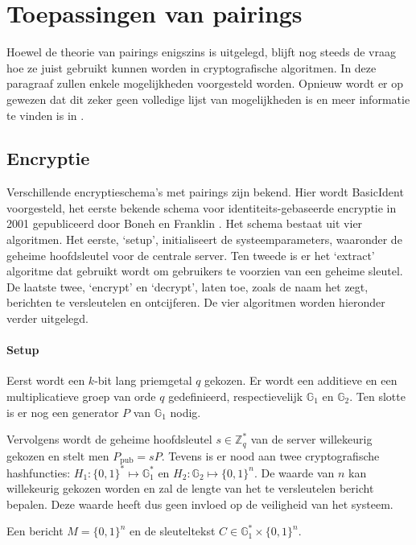 \section{Toepassingen van pairings}

Hoewel de theorie van pairings enigszins is uitgelegd, blijft nog steeds de vraag hoe ze juist gebruikt kunnen worden in cryptografische algoritmen. In deze paragraaf zullen enkele mogelijkheden voorgesteld worden. Opnieuw wordt er op gewezen dat dit zeker geen volledige lijst van mogelijkheden is en meer informatie te vinden is in \cite{maas}.

\subsection{Encryptie}

Verschillende encryptieschema's met pairings zijn bekend. Hier wordt BasicIdent voorgesteld, het eerste bekende schema voor identiteits-gebaseerde encryptie in 2001 gepubliceerd door Boneh en Franklin \cite{boneh}. Het schema bestaat uit vier algoritmen. Het eerste, `setup', initialiseert de systeemparameters, waaronder de geheime hoofdsleutel voor de centrale server. Ten tweede is er het `extract' algoritme dat gebruikt wordt om gebruikers te voorzien van een geheime sleutel. De laatste twee, `encrypt' en `decrypt', laten toe, zoals de naam het zegt, berichten te versleutelen en ontcijferen. De vier algoritmen worden hieronder verder uitgelegd.

\paragraph{Setup} Eerst wordt een $k$-bit lang priemgetal $q$ gekozen. Er wordt een additieve en een multiplicatieve groep van orde $q$ gedefinieerd, respectievelijk $\mathbb{G}_1$ en  $\mathbb{G}_2$. Ten slotte is er nog een generator $P$ van $\mathbb{G}_1$ nodig.

Vervolgens wordt de geheime hoofdsleutel $s \in \mathbb{Z}^*_q$ van de server willekeurig gekozen en stelt men $P_{\text{pub}} = sP$. Tevens is er nood aan twee cryptografische hashfuncties: $H_1 : \{ 0,1 \}^* \mapsto \mathbb{G}_1^*$ en $H_2 : \mathbb{G}_2 \mapsto \{ 0, 1 \}^n$. De waarde van $n$ kan willekeurig gekozen worden en zal de lengte van het te versleutelen bericht bepalen. Deze waarde heeft dus geen invloed op de veiligheid van het systeem.

Een bericht $M = \{ 0,1 \}^n$ en de sleuteltekst $C \in \mathbb{G}_1^* \times \{ 0,1 \}^n$.


